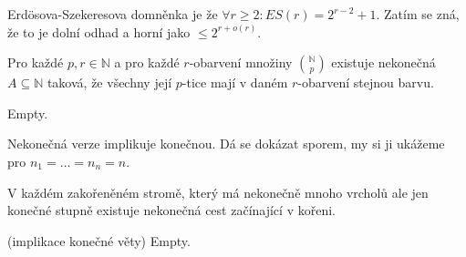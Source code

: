 Erdösova-Szekeresova domněnka je že $\forall r \geq 2: ES(r) = 2^{r-2}+1$. Zatím se zná, že to je dolní odhad a horní jako $\leq 2^{r+o(r)}$.

\begin{veta}
	Pro každé $p,r \in \mathbb{N}$ a pro každé $r$-obarvení množiny $\binom{\mathbb{N}}{p}$ existuje nekonečná $A \subseteq \mathbb{N}$ taková, že všechny její $p$-tice mají v daném $r$-obarvení stejnou barvu.
\end{veta}

\begin{dukaz}
	Empty.
\end{dukaz}

Nekonečná verze implikuje konečnou. Dá se dokázat sporem, my si ji ukážeme pro $n_{1} = \dots = n_{n} = n$.

\begin{lemma}
	V každém zakořeněném stromě, který má nekonečně mnoho vrcholů ale jen konečné stupně existuje nekonečná cest začínající v kořeni.
\end{lemma}

\begin{dukaz}(implikace konečné věty)
	Empty.
\end{dukaz}
